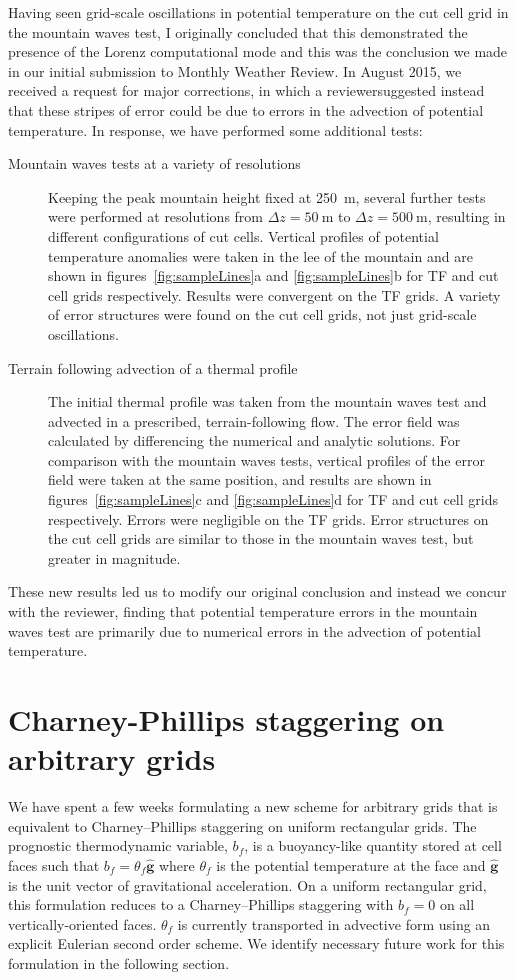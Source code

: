 \documentclass[a4paper]{article}
\begin{document}
Having seen grid-scale oscillations in potential temperature on the cut cell grid in the mountain waves test, I originally concluded that this demonstrated the presence of the Lorenz computational mode and this was the conclusion we made in our initial submission to Monthly Weather Review.  In August 2015, we received a request for major corrections, in which a reviewersuggested instead that these stripes of error could be due to errors in the advection of potential temperature.
In response, we have performed some additional tests:
\begin{description}
	\item[Mountain waves tests at a variety of resolutions]{Keeping the peak mountain height fixed at \SI{250}{\meter}, several further tests were performed at resolutions from $\Delta z = \SI{50}{\meter}$ to $\Delta z = \SI{500}{\meter}$, resulting in different configurations of cut cells.  Vertical profiles of potential temperature anomalies were taken in the lee of the mountain and are shown in figures~\ref{fig:sampleLines}a and \ref{fig:sampleLines}b for TF and cut cell grids respectively.  Results were convergent on the TF grids.  A variety of error structures were found on the cut cell grids, not just grid-scale oscillations.}
	\item[Terrain following advection of a thermal profile]{The initial thermal profile was taken from the mountain waves test and advected in a prescribed, terrain-following flow.  The error field was calculated by differencing the numerical and analytic solutions.  For comparison with the mountain waves tests, vertical profiles of the error field were taken at the same position, and results are shown in figures~\ref{fig:sampleLines}c and \ref{fig:sampleLines}d for TF and cut cell grids respectively.  Errors were negligible on the TF grids.  Error structures on the cut cell grids are similar to those in the mountain waves test, but greater in magnitude.}
\end{description}
These new results led us to modify our original conclusion and instead we concur with the reviewer, finding that potential temperature errors in the mountain waves test are primarily due to numerical errors in the advection of potential temperature.

\section{Charney-Phillips staggering on arbitrary grids}
\label{sec:cp}
  We have spent a few weeks formulating a new scheme for arbitrary grids that is equivalent to Charney--Phillips staggering on uniform rectangular grids.  The prognostic thermodynamic variable, $b_f$, is a buoyancy-like quantity stored at cell faces such that $b_f = \theta_f \bm{\hat{g}}$ where $\theta_f$ is the potential temperature at the face and $\bm{\hat{g}}$ is the unit vector of gravitational acceleration.  On a uniform rectangular grid, this formulation reduces to a Charney--Phillips staggering with $b_f = 0$ on all vertically-oriented faces.  $\theta_f$ is currently transported in advective form using an explicit Eulerian second order scheme.  We identify necessary future work for this formulation in the following section.
\end{document}
